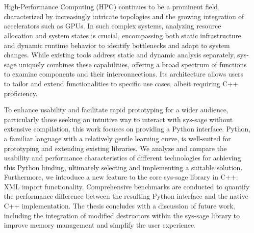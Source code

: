 \chapter{\abstractname}

\noindent High-Performance Computing (HPC) continues to be a prominent field, characterized by increasingly intricate topologies and the growing integration of accelerators such as GPUs. In such complex systems, analyzing resource allocation and system states is crucial, encompassing both static infrastructure and dynamic runtime behavior to identify bottlenecks and adapt to system changes. While existing tools address static and dynamic analysis separately, sys-sage uniquely combines these capabilities, offering a broad spectrum of functions to examine components and their interconnections. Its architecture allows users to tailor and extend functionalities to specific use cases, albeit requiring C++ proficiency.   

To enhance usability and facilitate rapid prototyping for a wider audience, particularly those seeking an intuitive way to interact with sys-sage without extensive compilation, this work focuses on providing a Python interface. Python, a familiar language with a relatively gentle learning curve, is well-suited for prototyping and extending existing libraries. We analyze and compare the usability and performance characteristics of different technologies for achieving this Python binding, ultimately selecting and implementing a suitable solution. Furthermore, we introduce a new feature to the core sys-sage library in C++: XML import functionality. Comprehensive benchmarks are conducted to quantify the performance difference between the resulting Python interface and the native C++ implementation. The thesis concludes with a discussion of future work, including the integration of modified destructors within the sys-sage library to improve memory management and simplify the user experience.   


